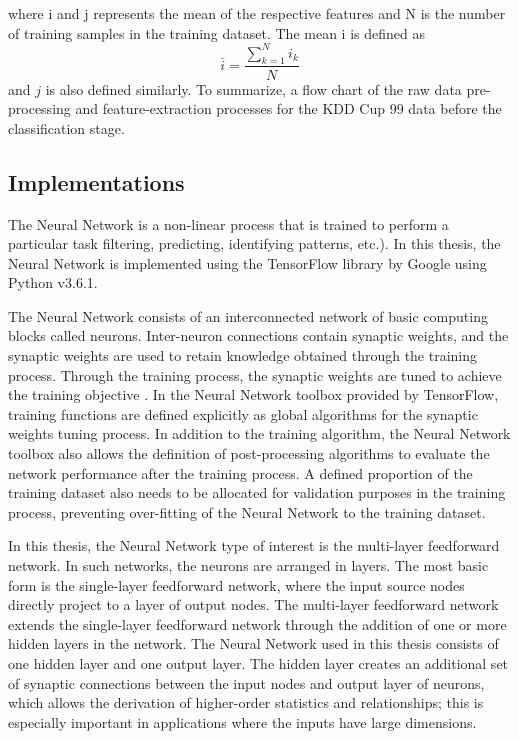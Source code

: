 \documentclass[12pt]{article}
\theoremstyle{definition}
\begin{document}
			where i and j represents the mean of the respective features and N is the number of training samples in the training dataset. The mean i is defined as
			\begin{equation}
				\bar{i} = \frac{\sum_{k=1}^{N}i_{k}}{N}
			\end{equation}
			and $j$ is also defined similarly. To summarize, a flow chart of the raw data pre-processing and feature-extraction processes for the KDD Cup 99 data before the classification stage.
			
		\subsection{Implementations}
			
			The Neural Network is a non-linear process that is trained to perform a particular task filtering, predicting, identifying patterns, etc.). In this thesis, the Neural Network is implemented using the TensorFlow library by Google using Python v3.6.1.
			
			
			The Neural Network consists of an interconnected network of basic computing blocks called
			neurons. Inter-neuron connections contain synaptic weights, and the synaptic weights are
			used to retain knowledge obtained through the training process. Through the training
			process, the synaptic weights are tuned to achieve the training objective \cite{Wang2010}. In the Neural Network
			toolbox provided by TensorFlow, training functions are defined explicitly as global
			algorithms for the synaptic weights tuning process. In addition to the training algorithm,
			the Neural Network toolbox also allows the definition of post-processing algorithms to evaluate the
			network performance after the training process. A defined proportion of the training
			dataset also needs to be allocated for validation purposes in the training process,
			preventing over-fitting of the Neural Network to the training dataset.
			
			In this thesis, the Neural Network type of interest is the multi-layer feedforward network. In such networks, the neurons are arranged in layers. The most basic form is the single-layer feedforward network, where the input source nodes directly project to a layer of output nodes. The multi-layer feedforward network extends the single-layer feedforward network through the addition of one or more hidden layers in the network. The Neural Network used in this thesis consists of one hidden layer and one output layer. The hidden layer creates an additional set of synaptic connections between the input nodes and output layer of neurons, which allows the derivation of higher-order statistics and relationships; this is especially important in applications where the inputs have large dimensions.
			
\end{document}
